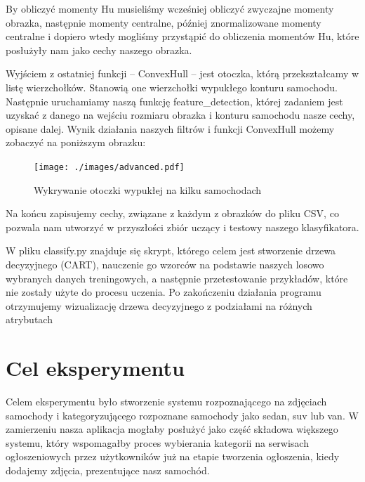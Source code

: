 \documentclass{article}
\begin{document}
By obliczyć momenty Hu musieliśmy wcześniej obliczyć zwyczajne momenty obrazka, następnie momenty centralne, później znormalizowane momenty centralne i dopiero wtedy mogliśmy przystąpić do obliczenia momentów Hu, które posłużyły nam jako cechy naszego obrazka.

Wyjściem z ostatniej funkcji -- ConvexHull -- jest otoczka, którą przekształcamy w listę wierzchołków. Stanowią one wierzchołki wypukłego konturu samochodu. Następnie uruchamiamy naszą funkcję feature\_detection, której zadaniem jest uzyskać z danego na wejściu rozmiaru obrazka i konturu samochodu nasze cechy, opisane dalej. Wynik działania naszych filtrów i funkcji ConvexHull możemy zobaczyć na poniższym obrazku:

\begin{figure}[H]
\begin{center}
\texttt{[image: ./images/advanced.pdf]}
\end{center}
\caption{Wykrywanie otoczki wypukłej na kilku samochodach}
\label{fig: wykres2}
\end{figure}

Na końcu zapisujemy cechy, związane z każdym z obrazków do pliku CSV, co pozwala nam utworzyć w przyszłości zbiór uczący i testowy naszego klasyfikatora.

W pliku classify.py znajduje się skrypt, którego celem jest stworzenie drzewa decyzyjnego (CART), nauczenie go wzorców na podstawie naszych losowo wybranych danych treningowych, a następnie przetestowanie przykładów, które nie zostały użyte do procesu uczenia. Po zakończeniu działania programu otrzymujemy wizualizację drzewa decyzyjnego z podziałami na różnych atrybutach
 
\section{Cel eksperymentu}
Celem eksperymentu było stworzenie systemu rozpoznającego na zdjęciach samochody i kategoryzującego rozpoznane samochody jako sedan, suv lub van. W zamierzeniu nasza aplikacja mogłaby posłużyć jako część składowa większego systemu, który wspomagałby proces wybierania kategorii na serwisach ogłoszeniowych przez użytkowników już na etapie tworzenia ogłoszenia, kiedy dodajemy zdjęcia, prezentujące nasz samochód.
\end{document}
